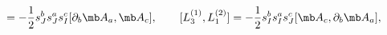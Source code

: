 \begin{equation}
[L^{(2)}_{3},L^{(1)}_{1}]=-\frac{1}{2}s^{b}_{J}s^{a}_{J}s^{c}_{I}[\partial_{b}{\mb A}_{a},{\mb A}_{c}],
\qquad
[L^{(1)}_{3},L^{(2)}_{1}]=-\frac{1}{2}s^{b}_{I}s^{a}_{I}s^{c}_{J}[{\mb A}_{c},\partial_{b}{\mb A}_{a}],
\end{equation}

